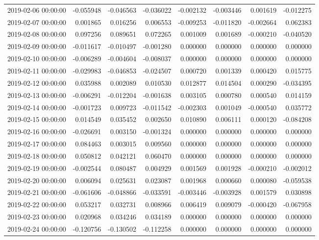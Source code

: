 \begin{tabular}{lrrrrrrr}
2019-02-06 00:00:00 & -0.055948 & -0.046563 & -0.036022 & -0.002132 & -0.003446 & 0.001619 & -0.012275 \\
2019-02-07 00:00:00 & 0.001865 & 0.016256 & 0.006553 & -0.009253 & -0.011820 & -0.002664 & 0.062383 \\
2019-02-08 00:00:00 & 0.097256 & 0.089651 & 0.072265 & 0.001009 & 0.001689 & -0.000210 & -0.040520 \\
2019-02-09 00:00:00 & -0.011617 & -0.010497 & -0.001280 & 0.000000 & 0.000000 & 0.000000 & 0.000000 \\
2019-02-10 00:00:00 & -0.006289 & -0.004604 & -0.008037 & 0.000000 & 0.000000 & 0.000000 & 0.000000 \\
2019-02-11 00:00:00 & -0.029983 & -0.046853 & -0.024507 & 0.000720 & 0.001339 & 0.000420 & 0.015775 \\
2019-02-12 00:00:00 & 0.035988 & 0.002089 & 0.010530 & 0.012877 & 0.014504 & 0.000290 & -0.034395 \\
2019-02-13 00:00:00 & -0.006291 & -0.012204 & -0.001638 & 0.003105 & 0.000780 & 0.000540 & 0.014159 \\
2019-02-14 00:00:00 & -0.001723 & 0.009723 & -0.011542 & -0.002303 & 0.001049 & -0.000540 & 0.035772 \\
2019-02-15 00:00:00 & 0.014549 & 0.035452 & 0.002650 & 0.010890 & 0.006111 & 0.000120 & -0.084208 \\
2019-02-16 00:00:00 & -0.026691 & 0.003150 & -0.001324 & 0.000000 & 0.000000 & 0.000000 & 0.000000 \\
2019-02-17 00:00:00 & 0.084463 & 0.003015 & 0.009560 & 0.000000 & 0.000000 & 0.000000 & 0.000000 \\
2019-02-18 00:00:00 & 0.050812 & 0.042121 & 0.060470 & 0.000000 & 0.000000 & 0.000000 & 0.000000 \\
2019-02-19 00:00:00 & -0.002544 & 0.080487 & 0.004929 & 0.001569 & 0.001928 & -0.000210 & -0.002012 \\
2019-02-20 00:00:00 & 0.006094 & 0.025631 & 0.023087 & 0.001968 & 0.000660 & 0.000080 & -0.059538 \\
2019-02-21 00:00:00 & -0.061606 & -0.048866 & -0.033591 & -0.003446 & -0.003928 & 0.001579 & 0.030898 \\
2019-02-22 00:00:00 & 0.053217 & 0.032731 & 0.008966 & 0.006419 & 0.009079 & -0.000420 & -0.067958 \\
2019-02-23 00:00:00 & 0.020968 & 0.034246 & 0.034189 & 0.000000 & 0.000000 & 0.000000 & 0.000000 \\
2019-02-24 00:00:00 & -0.120756 & -0.130502 & -0.112258 & 0.000000 & 0.000000 & 0.000000 & 0.000000 \\

\end{tabular}
